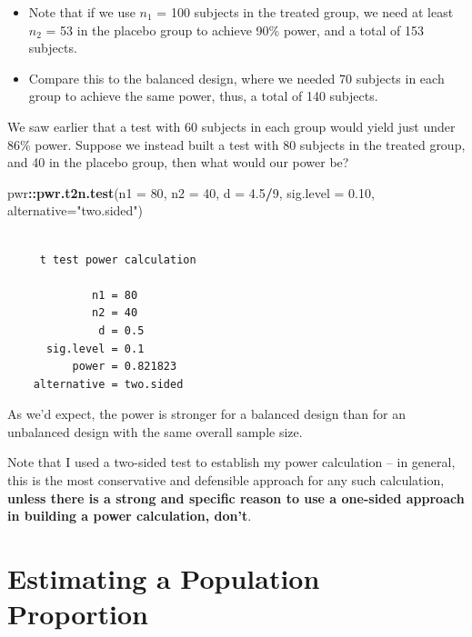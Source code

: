 \documentclass[
]{book}
\newenvironment{Shaded}{\begin{snugshade}}{\end{snugshade}}
\newcommand{\DataTypeTok}[1]{\textcolor[rgb]{0.13,0.29,0.53}{#1}}
\newcommand{\DecValTok}[1]{\textcolor[rgb]{0.00,0.00,0.81}{#1}}
\newcommand{\FloatTok}[1]{\textcolor[rgb]{0.00,0.00,0.81}{#1}}
\newcommand{\KeywordTok}[1]{\textcolor[rgb]{0.13,0.29,0.53}{\textbf{#1}}}
\newcommand{\NormalTok}[1]{#1}
\newcommand{\OperatorTok}[1]{\textcolor[rgb]{0.81,0.36,0.00}{\textbf{#1}}}
\newcommand{\StringTok}[1]{\textcolor[rgb]{0.31,0.60,0.02}{#1}}
\providecommand{\tightlist}{%
  \setlength{\itemsep}{0pt}\setlength{\parskip}{0pt}}
\begin{document}
\begin{itemize}
\tightlist
\item
  Note that if we use \(n_1\) = 100 subjects in the treated group, we need at least \(n_2\) = 53 in the placebo group to achieve 90\% power, and a total of 153 subjects.
\item
  Compare this to the balanced design, where we needed 70 subjects in each group to achieve the same power, thus, a total of 140 subjects.
\end{itemize}

We saw earlier that a test with 60 subjects in each group would yield just under 86\% power. Suppose we instead built a test with 80 subjects in the treated group, and 40 in the placebo group, then what would our power be?

\begin{Shaded}
\begin{Highlighting}[]
\NormalTok{pwr}\OperatorTok{::}\KeywordTok{pwr.t2n.test}\NormalTok{(}\DataTypeTok{n1 =} \DecValTok{80}\NormalTok{, }\DataTypeTok{n2 =} \DecValTok{40}\NormalTok{, }\DataTypeTok{d =} \FloatTok{4.5}\OperatorTok{/}\DecValTok{9}\NormalTok{, }
             \DataTypeTok{sig.level =} \FloatTok{0.10}\NormalTok{,}
             \DataTypeTok{alternative=}\StringTok{"two.sided"}\NormalTok{)}
\end{Highlighting}
\end{Shaded}

\begin{verbatim}

     t test power calculation 

             n1 = 80
             n2 = 40
              d = 0.5
      sig.level = 0.1
          power = 0.821823
    alternative = two.sided
\end{verbatim}

As we'd expect, the power is stronger for a balanced design than for an unbalanced design with the same overall sample size.

Note that I used a two-sided test to establish my power calculation -- in general, this is the most conservative and defensible approach for any such calculation, \textbf{unless there is a strong and specific reason to use a one-sided approach in building a power calculation, don't}.

\hypertarget{estimating-a-population-proportion}{%
\chapter{Estimating a Population Proportion}\label{estimating-a-population-proportion}}
\end{document}

